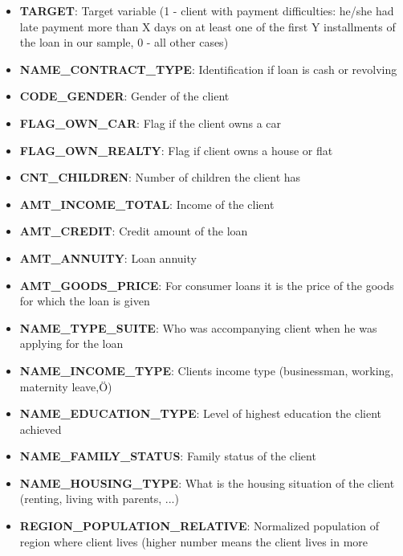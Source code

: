 \documentclass[11pt]{article}
\providecommand{\tightlist}{%
      \setlength{\itemsep}{0pt}\setlength{\parskip}{0pt}}
\begin{document}
\begin{itemize}
\tightlist
\item
  \textbf{TARGET}: Target variable (1 - client with payment
  difficulties: he/she had late payment more than X days on at least one
  of the first Y installments of the loan in our sample, 0 - all other
  cases)\\
\item
  \textbf{NAME\_CONTRACT\_TYPE}: Identification if loan is cash or
  revolving\\
\item
  \textbf{CODE\_GENDER}: Gender of the client
\item
  \textbf{FLAG\_OWN\_CAR}: Flag if the client owns a car\\
\item
  \textbf{FLAG\_OWN\_REALTY}: Flag if client owns a house or flat\\
\item
  \textbf{CNT\_CHILDREN}: Number of children the client has\\
\item
  \textbf{AMT\_INCOME\_TOTAL}: Income of the client\\
\item
  \textbf{AMT\_CREDIT}: Credit amount of the loan
\item
  \textbf{AMT\_ANNUITY}: Loan annuity
\item
  \textbf{AMT\_GOODS\_PRICE}: For consumer loans it is the price of the
  goods for which the loan is given\\
\item
  \textbf{NAME\_TYPE\_SUITE}: Who was accompanying client when he was
  applying for the loan\\
\item
  \textbf{NAME\_INCOME\_TYPE}: Clients income type (businessman,
  working, maternity leave,Ö)\\
\item
  \textbf{NAME\_EDUCATION\_TYPE}: Level of highest education the client
  achieved
\item
  \textbf{NAME\_FAMILY\_STATUS}: Family status of the client\\
\item
  \textbf{NAME\_HOUSING\_TYPE}: What is the housing situation of the
  client (renting, living with parents, ...)\\
\item
  \textbf{REGION\_POPULATION\_RELATIVE}: Normalized population of region
  where client lives (higher number means the client lives in more

\end{itemize}
\end{document}
